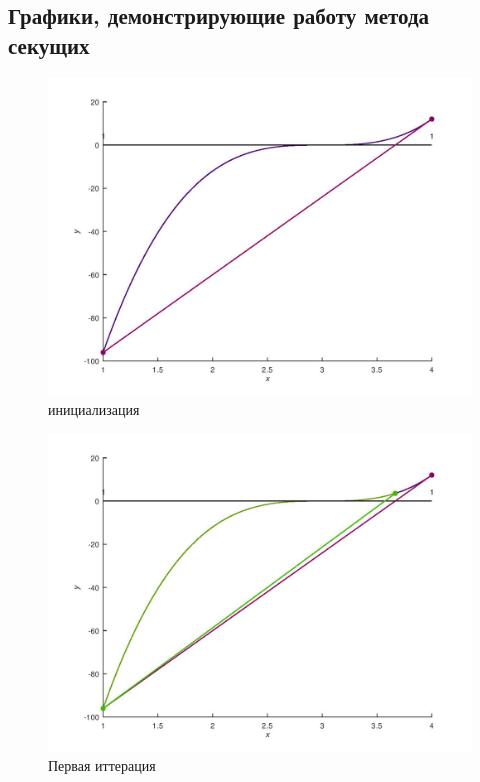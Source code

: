 \documentclass[a4paper,12pt]{article}
\begin{document}
\subsection*{Графики, демонстрирующие работу метода секущих}
    \begin{figure}[H]
        \centering
        \includegraphics[scale=0.4]{0secantitter.jpg}
        \caption{инициализация}
    \end{figure}
    \begin{figure}[H]
        \centering
        \includegraphics[scale=0.4]{1secantitter.jpg}
        \caption{Первая иттерация}
    \end{figure}
\end{document}
